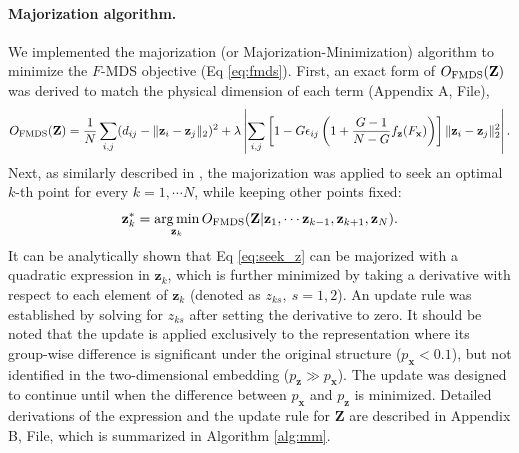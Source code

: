 \documentclass[10pt,letterpaper]{article}
\DeclareMathOperator*{\argmin}{arg\,min}
\newcommand{\1}{{\rm 1}\kern-0.24em{\rm I}}
\begin{document}
\paragraph*{Majorization algorithm.}
We implemented the majorization (or Majorization-Minimization) algorithm to minimize the $F$-MDS objective (Eq \ref{eq:fmds}). First, an exact form of $O_{\rm FMDS}(\mathbf{Z})$ was derived to match the physical dimension of each term (Appendix A,  File),
\begin{equation}
    O_{\rm FMDS}(\mathbf{Z}) = \frac{1}{N}\sum_{i,j} (d_{ij} - \| \mathbf{z}_i - \mathbf{z}_j \|_2 )^2 + \lambda\left|\sum_{i,j} \left[1- G\epsilon_{ij} \left(1+\frac{G-1}{N-G}f_\mathbf{z}(F_\mathbf{x})\right)\right] \|\mathbf{z}_i - \mathbf{z}_j\|_2^2\right|.
\end{equation}
Next, as similarly described in \cite{borg05c, witten11}, the majorization was applied to seek an optimal $k$-th point for every $k=1,\cdots N$, while keeping other points fixed:
\begin{equation}
    \mathbf{z}_k^* = \argmin_{\mathbf{z}_k}O_{\rm FMDS}(\mathbf{Z} | \mathbf{z}_1,\cdots \mathbf{z}_{k-1}, \mathbf{z}_{k+1}, \mathbf{z}_N).
    \label{eq:seek_z}
\end{equation}
It can be analytically shown that Eq \ref{eq:seek_z} can be majorized with a quadratic expression in $\mathbf{z}_k$, which is further minimized by taking a derivative with respect to each element of $\mathbf{z}_k$ (denoted as ${z}_{ks},\ s=1,2$). An update rule was established by solving for ${z}_{ks}$ after setting the derivative to zero. It should be noted that the update is applied exclusively to the representation where its group-wise difference is significant under the original structure ($p_\mathbf{x} < 0.1$), but not identified in the two-dimensional embedding ($p_\mathbf{z}\gg p_\mathbf{x}$). The update was designed to continue until when the difference between $p_\mathbf{x}$ and $p_\mathbf{z}$ is minimized. Detailed derivations of the expression and the update rule for $\mathbf{Z}$ are described in Appendix B,  File, which is summarized in Algorithm \ref{alg:mm}.
\end{document}
